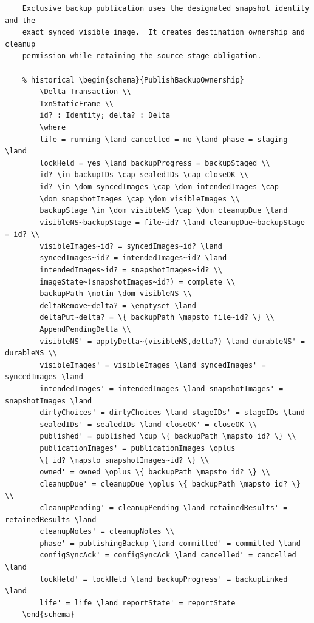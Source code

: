 \documentclass{article}
\begin{document}
\begin{verbatim}
	Exclusive backup publication uses the designated snapshot identity and the
	exact synced visible image.  It creates destination ownership and cleanup
	permission while retaining the source-stage obligation.

	% historical \begin{schema}{PublishBackupOwnership}
		\Delta Transaction \\
		TxnStaticFrame \\
		id? : Identity; delta? : Delta
		\where
		life = running \land cancelled = no \land phase = staging \land
		lockHeld = yes \land backupProgress = backupStaged \\
		id? \in backupIDs \cap sealedIDs \cap closeOK \\
		id? \in \dom syncedImages \cap \dom intendedImages \cap
		\dom snapshotImages \cap \dom visibleImages \\
		backupStage \in \dom visibleNS \cap \dom cleanupDue \land
		visibleNS~backupStage = file~id? \land cleanupDue~backupStage = id? \\
		visibleImages~id? = syncedImages~id? \land
		syncedImages~id? = intendedImages~id? \land
		intendedImages~id? = snapshotImages~id? \\
		imageState~(snapshotImages~id?) = complete \\
		backupPath \notin \dom visibleNS \\
		deltaRemove~delta? = \emptyset \land
		deltaPut~delta? = \{ backupPath \mapsto file~id? \} \\
		AppendPendingDelta \\
		visibleNS' = applyDelta~(visibleNS,delta?) \land durableNS' = durableNS \\
		visibleImages' = visibleImages \land syncedImages' = syncedImages \land
		intendedImages' = intendedImages \land snapshotImages' = snapshotImages \land
		dirtyChoices' = dirtyChoices \land stageIDs' = stageIDs \land
		sealedIDs' = sealedIDs \land closeOK' = closeOK \\
		published' = published \cup \{ backupPath \mapsto id? \} \\
		publicationImages' = publicationImages \oplus
		\{ id? \mapsto snapshotImages~id? \} \\
		owned' = owned \oplus \{ backupPath \mapsto id? \} \\
		cleanupDue' = cleanupDue \oplus \{ backupPath \mapsto id? \} \\
		cleanupPending' = cleanupPending \land retainedResults' = retainedResults \land
		cleanupNotes' = cleanupNotes \\
		phase' = publishingBackup \land committed' = committed \land
		configSyncAck' = configSyncAck \land cancelled' = cancelled \land
		lockHeld' = lockHeld \land backupProgress' = backupLinked \land
		life' = life \land reportState' = reportState
	\end{schema}


\end{verbatim}
\end{document}
